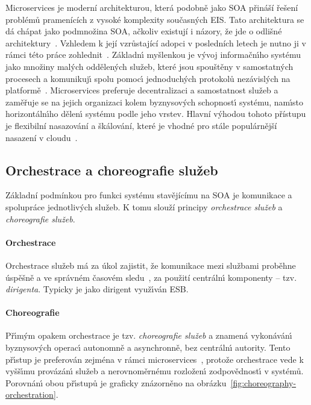 Microservices je moderní architekturou, která podobně jako \gls{SOA} přináší řešení
problémů pramenících z vysoké komplexity současných \gls{EIS}.
Tato architektura se dá chápat jako podmnožina \gls{SOA}, ačkoliv existují i názory,
že jde o odlišné architektury~\cite{richards2015microservices}\cite{cerny2017disambiguation}.
Vzhledem k její vzrůstající adopci v posledních letech je nutno ji v rámci této práce zohlednit~\cite{xiao2016reflections}.
Základn\'{\i} myšlenkou je v\'yvoj informačn\'{\i}ho systému jako množiny mal\'ych oddělen\'ych služeb,
které jsou spouštěny v samostatn\'ych procesech a komunikuj\'{\i} spolu pomoc\'{\i} jednoduch\'ych
protokolů nezávislých na platformě~\cite{lewis2014microservices}. Microservices preferuje decentralizaci a samostatnost služeb
a zaměřuje se na jejich organizaci kolem byznysov\'ych schopnost\'{\i} systému, nam\'{\i}sto horizontáln\'{\i}ho
dělen\'{\i} systému podle jeho vrstev. Hlavní výhodou tohoto přístupu je flexibilní nasazování a škálování, které je vhodné
pro stále populárnější nasazení v cloudu~\cite{kratzke2017understanding}\cite{cerny2018contextual}\cite{xiao2016reflections}.

\subsection{Orchestrace a choreografie služeb}

Základní podmínkou pro funkci systému stavějícímu na \gls{SOA} je komunikace a spolupráce jednotlivých služeb.
K tomu slouží principy \textit{orchestrace služeb} a \textit{choreografie služeb}.

\paragraph{Orchestrace}
Orchestrace služeb má za úkol zajistit, že komunikace mezi službami
proběhne úspěšně a ve správném časovém sledu~\cite{orchestration},
za použití centráln\'{\i} komponenty -- tzv. \textit{dirigenta}.
Typicky je jako dirigent využ\'{\i}ván \gls{ESB}.

\paragraph{Choreografie}
Př\'{\i}m\'ym opakem orchestrace je tzv. \textit{choreografie služeb} a znamená
vykonáván\'{\i} byznysov\'ych operac\'{\i} autonomně a asynchronně, bez centráln\'{\i}
autority. Tento př\'{\i}stup je preferován zejména v rámci microservices~\cite{dragoni2017microservices},
protože orchestrace vede k vyšš\'{\i}mu provázán\'{\i} služeb a nerovnoměrnému rozložen\'{\i}
zodpovědnost\'{\i} v systémů. Porovnán\'{\i} obou př\'{\i}stupů je graficky
znázorněno na obrázku~\ref{fig:choreography-orchestration}.

